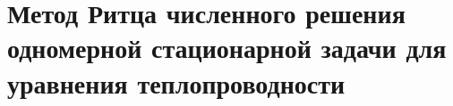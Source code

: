 \documentclass[__main__.tex]{subfiles}
\begin{document}
\section{Метод Ритца численного решения одномерной стационарной задачи для уравнения теплопроводности}
\end{document}
